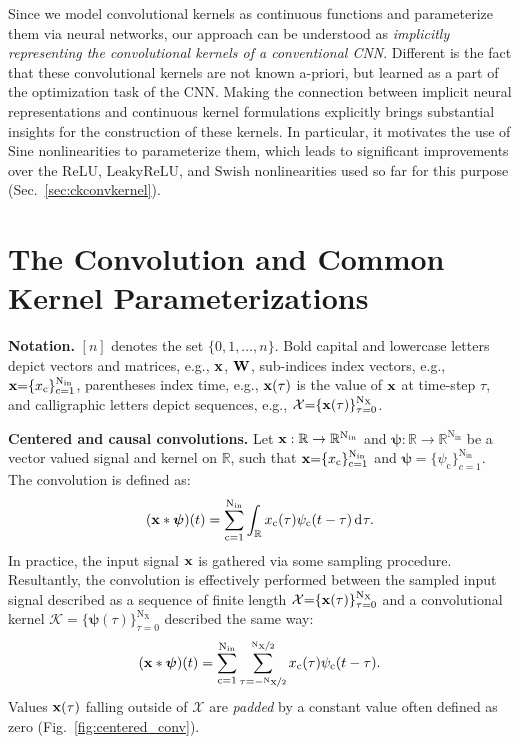 \documentclass{article}
\def\gK{{\mathcal{K}}}
\def\gX{{\mathcal{X}}}
\def\sR{{\mathbb{R}}}
\newcommand{\mat}[1]{\ensuremath{{\mathbf{\MakeUppercase{{#1}}}}}}
\renewcommand{\vec}[1]{\ensuremath{\mathbf{\MakeLowercase{{#1}}}}}
\newcommand{\Wm}{\mat{W}}
\newcommand{\xv}{\vec{x}}
\def\ct{\mathrm{c}}
\def\Nt{\mathrm{N}}
\def\Xt{\mathrm{X}}
\def\gK{{\mathcal{K}}}
\def\gX{{\mathcal{X}}}
\def\sR{{\mathbb{R}}}
\newcommand{\du}{\mathrm{d}\mkern1mu}
\begin{document}
Since we model convolutional kernels as continuous functions and parameterize them via neural networks, our approach can be understood as \textit{implicitly representing the convolutional kernels of a conventional CNN}.
Different is the fact that these convolutional kernels are not known a-priori, but learned as a part of the optimization task of the CNN. Making the connection between implicit neural representations and continuous kernel formulations explicitly brings substantial insights for the construction of these kernels. In particular, it motivates the use of $\mathrm{Sine}$ nonlinearities \citep{sitzmann2020implicit} to parameterize them, which leads to significant improvements over the $\mathrm{ReLU}$, $\mathrm{LeakyReLU}$, and $\mathrm{Swish}$ nonlinearities used so far for this purpose (Sec.~\ref{sec:ckconvkernel}).

\vspace{-2mm}
\section{The Convolution and Common Kernel Parameterizations}\label{sec:convolution}
\vspace{-2mm}
\textbf{Notation.} $[n]$ denotes the set $\{0, 1, \ldots, n\}$. Bold capital and lowercase letters depict vectors and matrices, e.g., $\xv$, $\Wm$, sub-indices index vectors, e.g., $\xv {=} \{x_{\ct}\}_{\ct = 1}^{\Nt_{\mathrm{in}}}$, parentheses index time, e.g., $\xv(\tau)$ is the value of $\xv$ at time-step $\tau$, and calligraphic letters depict sequences, e.g., $\gX {=} \{\xv(\tau) \}_{\tau {=} 0}^{\Nt_{\Xt}}$. 


\textbf{Centered and causal convolutions.} 
Let $\xv: \sR \rightarrow \sR^{\Nt_{\mathrm{in}}}$ and $\boldsymbol{\psi}:\sR \rightarrow \sR^{\Nt_{\mathrm{in}}}$ be a vector valued signal and kernel on $\sR$, such that $\xv{=}\{x_{\ct}\}_{\ct {=} 1}^{\Nt_{\mathrm{in}}}$ and $\boldsymbol{\psi} {=} \{ \psi_{\ct} \}_{c {=} 1}^{\Nt_{\mathrm{in}}}$. The convolution is defined as:
\begin{equation}
\setlength{\abovedisplayskip}{1pt}
\setlength{\belowdisplayskip}{1pt}
    (\xv * \boldsymbol{\psi})(t) = \sum_{\ct = 1}^{\Nt_{\mathrm{in}}} \int_{\sR} x_{\ct}(\tau) \psi_{\ct}(t - \tau) \, \du \tau. \label{eq:conv_def1}
\end{equation}
In practice, the input signal $\xv$ is gathered via some sampling procedure. Resultantly, the convolution is effectively performed between the sampled input signal described as a sequence of finite length $\gX {=} \{\xv(\tau) \}_{\tau {=} 0}^{\Nt_{\Xt}}$ and a convolutional kernel $\gK {=} \{\boldsymbol{\psi}(\tau) \}_{\tau {=} 0}^{\Nt_{\Xt}}$ described the same way:
\begin{equation}
\setlength{\abovedisplayskip}{1pt}
\setlength{\belowdisplayskip}{1pt}
    (\xv * \boldsymbol{\psi})(t) = \sum_{\ct = 1}^{\Nt_{\mathrm{in}}} \sum_{\tau = -\nicefrac{\Nt_{\Xt}}{2}}^{\nicefrac{\Nt_{\Xt}}{2}} x_{\ct}(\tau) \psi_{\ct}(t - \tau). \label{eq:conv_centered}
\end{equation}
Values $\xv(\tau)$ falling outside of $\gX$ are \textit{padded} by a constant value often defined as zero (Fig.~\ref{fig:centered_conv}).
\end{document}
